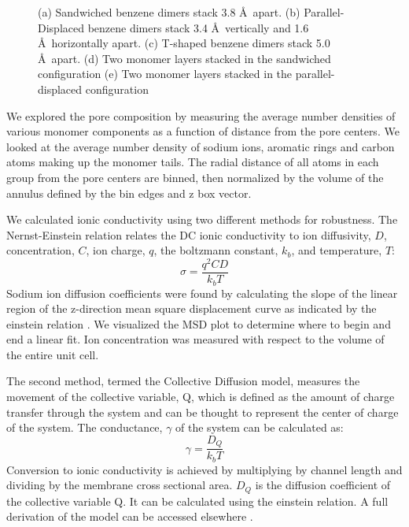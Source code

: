 \documentclass{article}
\newcommand{\angstrom}{\textup{\AA}}
\begin{document}
\begin{figure}
\begin{subfigure}[b]{0.475\textwidth}
		\caption{}\label{fig:offsetlayers}
	\end{subfigure}
	\caption{(a) Sandwiched benzene dimers stack 3.8 \angstrom~apart. (b) Parallel-Displaced benzene dimers stack
	3.4 \angstrom~vertically and 1.6 \angstrom~horizontally apart. (c) T-shaped benzene dimers stack 5.0 \angstrom~apart. 
	(d) Two monomer layers stacked in the sandwiched configuration (e) Two monomer layers stacked in the parallel-displaced
	configuration }\label{fig:stacking}
  \end{figure}
  
  We explored the pore composition by measuring the average number densities of
  various monomer components as a function of distance from the pore centers.  We
  looked at the average number density of sodium ions, aromatic rings and carbon
  atoms making up the monomer tails. The radial distance of all atoms in each
  group from the pore centers are binned, then normalized by the volume of the
  annulus defined by the bin edges and z box vector.

  We calculated ionic conductivity using two different methods for robustness.
  The Nernst-Einstein relation relates the DC ionic conductivity to ion
  diffusivity, $D$, concentration, $C$, ion charge, $q$, the boltzmann constant,
  $k_b$, and temperature, $T$: $$\sigma = \dfrac{q^2CD}{k_b T}$$ 
  Sodium ion diffusion coefficients were found by calculating the slope
  of the linear region of the z-direction mean square displacement curve as
  indicated by the einstein relation \cite{einstein_investigations_1956}. We
  visualized the MSD plot to determine where to begin and end a linear fit. Ion
  concentration was measured with respect to the volume of the entire unit cell. 

  The second method, termed the Collective Diffusion model, measures the
  movement of the collective variable, Q, which is defined as the amount of
  charge transfer through the system and can be thought to represent the center
  of charge of the system. The conductance, $\gamma$ of the system can be
  calculated as: $$ \gamma = \dfrac{D_Q}{k_b T} $$ Conversion to ionic
  conductivity is achieved by multiplying by channel length and dividing by the
  membrane cross sectional area.  $D_Q$ is the diffusion coefficient of the
  collective variable Q. It can be calculated using the einstein relation.  A
  full derivation of the model can be accessed elsewhere 
  \cite{liu_collective_2013}.
\end{document}
